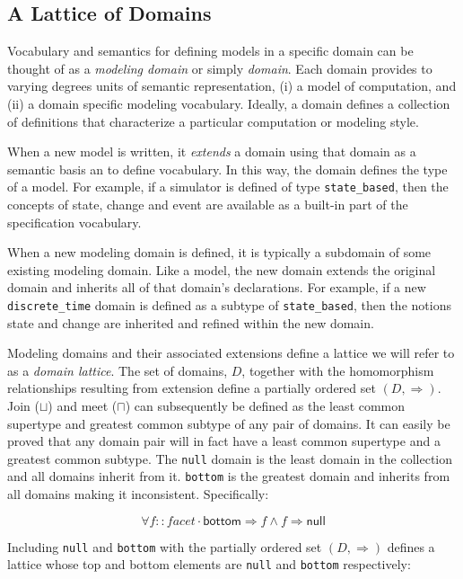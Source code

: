 \documentclass[12pt]{article}
\begin{document}
\subsection{A Lattice of Domains}

Vocabulary and semantics for defining models in a specific domain can be thought of as a
\emph{modeling domain} or simply \emph{domain}.  Each domain provides to varying degrees
units of semantic representation, (i) a model of computation, and (ii) a domain specific
modeling vocabulary.  Ideally, a domain defines a collection of definitions that
characterize a particular computation or modeling style.

When a new model is written, it \emph{extends} a domain using that domain as a semantic
basis an to define vocabulary.  In this way, the domain defines the type of a model.  For
example, if a simulator is defined of type \lstinline!state_based!, then the concepts of
state, change and event are available as a built-in part of the specification vocabulary.

When a new modeling domain is defined, it is typically a subdomain of some existing
modeling domain.  Like a model, the new domain extends the original domain and inherits
all of that domain's declarations.  For example, if a new \lstinline!discrete_time! domain
is defined as a subtype of \lstinline!state_based!, then the notions state and change are
inherited and refined within the new domain.

Modeling domains and their associated extensions define a lattice we will refer to as a
\emph{domain lattice}.  The set of domains, $D$, together with the homomorphism
relationships resulting from extension define a partially ordered set $(D,\Rightarrow)$.
Join ($\sqcup$) and meet ($\sqcap$) can subsequently be defined as the least common
supertype and greatest common subtype of any pair of domains.  It can easily be proved
that any domain pair will in fact have a least common supertype and a greatest common
subtype.  The \lstinline!null! domain is the least domain in the collection and all
domains inherit from it.  \lstinline!bottom! is the greatest domain and inherits from all
domains making it inconsistent.  Specifically:

\[\forall f::facet \cdot \mathsf{bottom} \Rightarrow f \wedge f \Rightarrow \mathsf{null}\]

\noindent
Including \lstinline!null! and \lstinline!bottom! with the partially ordered set
$(D,\Rightarrow)$ defines a lattice whose top and bottom elements are \lstinline!null! and
\lstinline!bottom! respectively:
\end{document}
